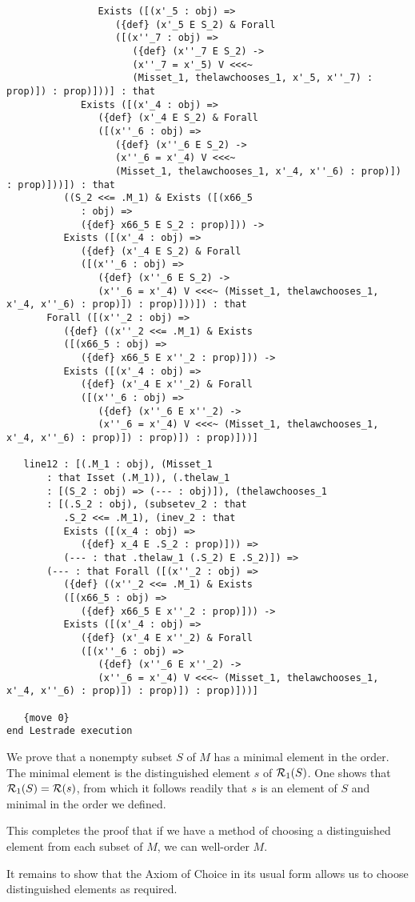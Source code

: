 \documentclass{article}
\begin{document}
\begin{verbatim}
                Exists ([(x'_5 : obj) => 
                   ({def} (x'_5 E S_2) & Forall 
                   ([(x''_7 : obj) => 
                      ({def} (x''_7 E S_2) -> 
                      (x''_7 = x'_5) V <<<~ 
                      (Misset_1, thelawchooses_1, x'_5, x''_7) : prop)]) : prop)]))] : that 
             Exists ([(x'_4 : obj) => 
                ({def} (x'_4 E S_2) & Forall 
                ([(x''_6 : obj) => 
                   ({def} (x''_6 E S_2) -> 
                   (x''_6 = x'_4) V <<<~ 
                   (Misset_1, thelawchooses_1, x'_4, x''_6) : prop)]) : prop)]))]) : that 
          ((S_2 <<= .M_1) & Exists ([(x66_5 
             : obj) => 
             ({def} x66_5 E S_2 : prop)])) -> 
          Exists ([(x'_4 : obj) => 
             ({def} (x'_4 E S_2) & Forall 
             ([(x''_6 : obj) => 
                ({def} (x''_6 E S_2) -> 
                (x''_6 = x'_4) V <<<~ (Misset_1, thelawchooses_1, x'_4, x''_6) : prop)]) : prop)]))]) : that 
       Forall ([(x''_2 : obj) => 
          ({def} ((x''_2 <<= .M_1) & Exists 
          ([(x66_5 : obj) => 
             ({def} x66_5 E x''_2 : prop)])) -> 
          Exists ([(x'_4 : obj) => 
             ({def} (x'_4 E x''_2) & Forall 
             ([(x''_6 : obj) => 
                ({def} (x''_6 E x''_2) -> 
                (x''_6 = x'_4) V <<<~ (Misset_1, thelawchooses_1, x'_4, x''_6) : prop)]) : prop)]) : prop)]))]

   line12 : [(.M_1 : obj), (Misset_1 
       : that Isset (.M_1)), (.thelaw_1 
       : [(S_2 : obj) => (--- : obj)]), (thelawchooses_1 
       : [(.S_2 : obj), (subsetev_2 : that 
          .S_2 <<= .M_1), (inev_2 : that 
          Exists ([(x_4 : obj) => 
             ({def} x_4 E .S_2 : prop)])) => 
          (--- : that .thelaw_1 (.S_2) E .S_2)]) => 
       (--- : that Forall ([(x''_2 : obj) => 
          ({def} ((x''_2 <<= .M_1) & Exists 
          ([(x66_5 : obj) => 
             ({def} x66_5 E x''_2 : prop)])) -> 
          Exists ([(x'_4 : obj) => 
             ({def} (x'_4 E x''_2) & Forall 
             ([(x''_6 : obj) => 
                ({def} (x''_6 E x''_2) -> 
                (x''_6 = x'_4) V <<<~ (Misset_1, thelawchooses_1, x'_4, x''_6) : prop)]) : prop)]) : prop)]))]

   {move 0}
end Lestrade execution
\end{verbatim}

We prove that a nonempty subset $S$ of $M$ has a minimal element in the order.  The minimal element is the distinguished element $s$ of ${\cal R}_1(S)$.  One shows
that ${\cal R}_1(S) = {\cal R}(s)$, from which it follows readily that $s$ is an element of $S$ and minimal in the order we defined.

This completes the proof that if we have a method of choosing a distinguished element from each subset of $M$, we can well-order $M$.

It remains to show that the Axiom of Choice in its usual form allows us to choose distinguished elements as required.
\end{document}
